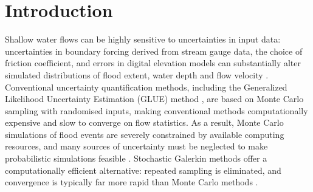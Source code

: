 \section{Introduction}
Shallow water flows can be highly sensitive to uncertainties in input data: uncertainties in boundary forcing derived from stream gauge data, the choice of friction coefficient, and errors in digital elevation models can substantially alter simulated distributions of flood extent, water depth and flow velocity \citep{bates2014,kim-sanders2016,jung-merwade2012}.
Conventional uncertainty quantification methods, including the Generalized Likelihood Uncertainty Estimation (GLUE) method \citep{beven-binley1992}, are based on Monte Carlo sampling with randomised inputs, making conventional methods computationally expensive and slow to converge on flow statistics.
As a result, Monte Carlo simulations of flood events are severely constrained by available computing resources, and many sources of uncertainty must be neglected to make probabilistic simulations feasible \citep{neal2013}.
Stochastic Galerkin methods offer a computationally efficient alternative: repeated sampling is eliminated, and convergence is typically far more rapid than Monte Carlo methods \citep{xiu2009,ge2008}.

